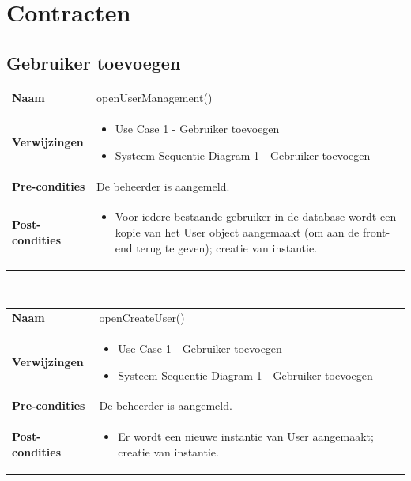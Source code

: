 \documentclass[a4paper]{article}
\begin{document}
\newpage
\section{Contracten}
\subsection{Gebruiker toevoegen}
\begin{tabularx}{\textwidth}{|l X|}
    \hline
    \textbf{Naam} & openUserManagement() \\
    \textbf{Verwijzingen} & \begin{itemize}[leftmargin=*]
        \item Use Case 1 - Gebruiker toevoegen
        \item Systeem Sequentie Diagram 1 - Gebruiker toevoegen
    \end{itemize}\\
    \textbf{Pre-condities} & De beheerder is aangemeld.\\
    \textbf{Post-condities} & \begin{itemize}[leftmargin=*]
        \item Voor iedere bestaande gebruiker in de database wordt een kopie van het User object aangemaakt (om aan de front-end terug te geven); creatie van instantie.
    \end{itemize}\\
    \hline
\end{tabularx}\\

\begin{tabularx}{\textwidth}{|l X|}
    \hline
    \textbf{Naam} & openCreateUser() \\
    \textbf{Verwijzingen} & \begin{itemize}[leftmargin=*]
        \item Use Case 1 - Gebruiker toevoegen
        \item Systeem Sequentie Diagram 1 - Gebruiker toevoegen
    \end{itemize}\\
    \textbf{Pre-condities} & De beheerder is aangemeld.\\
    \textbf{Post-condities} & \begin{itemize}[leftmargin=*]
        \item Er wordt een nieuwe instantie van User aangemaakt; creatie van instantie.
    \end{itemize}\\
    \hline
\end{tabularx}
\end{document}
